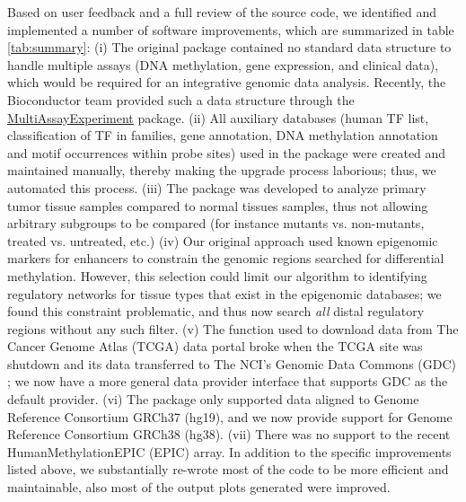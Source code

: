 Based on user feedback and a full review of the source code, we identified and implemented a number of software improvements, which are summarized in table \ref{tab:summary}: (i) The original package contained no standard data structure to handle multiple assays (DNA methylation, gene expression, and clinical data), which would be required for an integrative genomic data analysis. Recently, the Bioconductor team provided such a data structure through the \href{http://bioconductor.org/packages/MultiAssayExperiment/}{MultiAssayExperiment} package. (ii) All auxiliary databases (human TF list, classification of TF in families, gene annotation, DNA methylation annotation and motif occurrences within probe sites) used in the package were created and maintained manually, thereby making the upgrade process laborious; thus, we automated this process. (iii) The package was developed to analyze primary tumor tissue samples compared to normal tissues samples, thus not allowing arbitrary subgroups to be compared (for instance mutants vs. non-mutants, treated vs. untreated, etc.) (iv) Our original approach used known epigenomic markers for enhancers to constrain the genomic regions searched for differential methylation. However, this selection could limit our algorithm to identifying regulatory networks for tissue types that exist in the epigenomic databases; we found this constraint problematic, and thus now search \textit{all} distal regulatory regions without any such filter. (v) The function used to download data from The Cancer Genome Atlas (TCGA) data portal \cite{tomczak2015cancer} broke when the TCGA site was shutdown and its data transferred to The NCI's Genomic Data Commons (GDC) \cite{grossman2016toward}; we now have a more general data provider interface that supports GDC as the default provider. (vi) The package only supported data aligned to Genome Reference Consortium GRCh37 (hg19), and we now provide support for Genome Reference Consortium GRCh38 (hg38). (vii) There was no support to the recent HumanMethylationEPIC (EPIC) array. In addition to the specific improvements listed above, we substantially re-wrote most of the code to be more efficient and maintainable,  also most of the output plots generated were improved.


